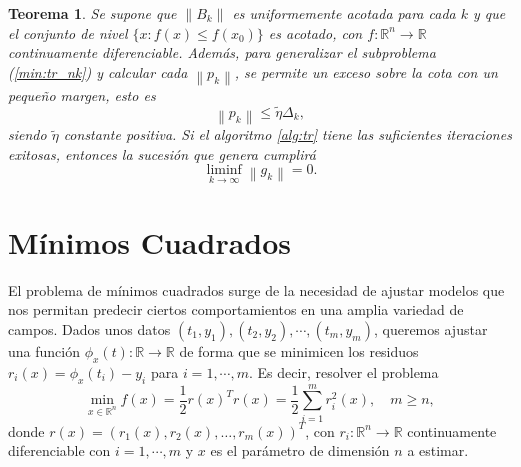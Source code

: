 \documentclass[11pt,a4paper]{book}
\newtheorem{theorem}{Teorema}[chapter]
\theoremstyle{definition}
\theoremstyle{remark}
\newcommand{\norm}[1]{\left\lVert#1\right\rVert}
\begin{document}
\begin{theorem} \label{th:conv-tr}
Se supone que $\norm{B_k}$ es uniformemente acotada para cada $k$
y que el conjunto de nivel $\{x:f(x)\leq f(x_0)\}$ es acotado, con $f: \mathbb{R}^n \to \mathbb{R}$
continuamente
diferenciable. Además, para generalizar el subproblema (\ref{min:tr_nk}) y calcular cada $\norm{p_k}$,
se permite
un exceso sobre la cota con un pequeño margen, esto es
\begin{equation}
	\norm{p_k} \leq \tilde{\eta} \Delta_k,
\end{equation}
siendo $\tilde{\eta}$ constante positiva.
Si el algoritmo \ref{alg:tr} tiene las suficientes iteraciones exitosas,
entonces la sucesión que genera cumplirá
\begin{equation}
	\liminf_{k\to \infty} \norm{g_k} = 0.
\end{equation}
\end{theorem}
\chapter{Mínimos Cuadrados}\label{ch:lsqp}

El problema de mínimos cuadrados surge de la necesidad de ajustar modelos que nos permitan predecir ciertos comportamientos en una amplia variedad de campos. Dados unos datos $(t_1,y_1),(t_2,y_2),\cdots,(t_m,y_m)$, queremos ajustar una función
$\phi_x(t):\mathbb{R} \rightarrow \mathbb{R}$ de forma que se minimicen los residuos $r_i(x) = \phi_x(t_i) - y_i$ para $i=1,\cdots,m$. Es decir, resolver el problema
\begin{equation}
	\min_{x\in \mathbb{R}^{n}}f(x) = \frac{1}{2} r(x)^Tr(x) = \frac{1}{2}\sum_{i=1}^{m}r_i^2(x), \quad m\geq n,
	\label{eq:lsp}
\end{equation}
donde $r(x) = (r_1(x), r_2(x), \ldots, r_m(x))^T$, con $r_i : \mathbb{R}^{n} \rightarrow \mathbb{R}$ continuamente diferenciable con $i = 1,\cdots,m$ y $x$ es el parámetro de dimensión $n$ a estimar.
\end{document}

